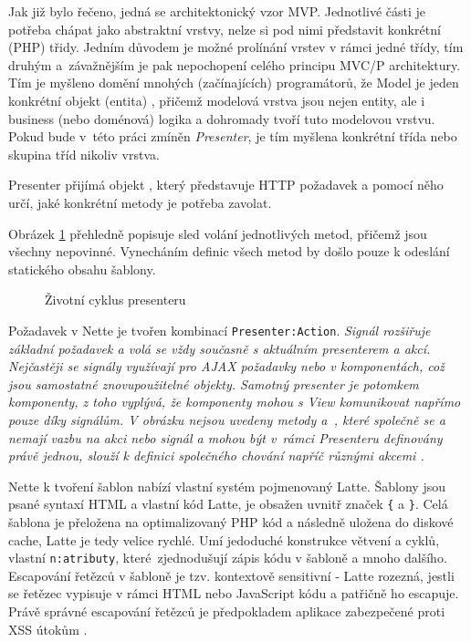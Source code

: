 Jak již bylo řečeno, jedná se architektonický vzor MVP. 
Jednotlivé části je potřeba chápat jako abstraktní vrstvy, nelze si pod nimi představit konkrétní (PHP) třidy. Jedním důvodem je možné prolínání vrstev v rámci jedné třídy, tím druhým a~závažnějším je pak nepochopení celého principu MVC/P architektury. Tím je myšleno domění mnohých (začínajících) programátorů, že Model je jeden konkrétní objekt (entita) \cite{MVCmodel}, přičemž modelová vrstva jsou nejen entity, ale i business (nebo doménová) logika a dohromady tvoří tuto modelovou vrstvu. Pokud bude v~této práci zmíněn \textit{Presenter}, je tím myšlena konkrétní třída nebo skupina tříd nikoliv vrstva.


Presenter přijímá objekt , který představuje HTTP požadavek a pomocí něho určí, jaké konkrétní metody je potřeba zavolat. 

Obrázek \ref{fig:zivotniCyklusPresenteru} přehledně popisuje sled volání jednotlivých metod, přičemž jsou všechny nepovinné. Vynecháním definic všech metod by došlo pouze k odeslání statického obsahu šablony.

\begin{figure}[h]
		\centering \footnotesize {}\selectfont
		
		\normalsize \sffamily
		\captionsetup{width=\linewidth}
		\caption[Životní cyklus presenteru]{Životní cyklus presenteru \cite{NetteDocs}}
		\label{fig:zivotniCyklusPresenteru}
\end{figure}

Požadavek v Nette je tvořen kombinací \texttt{Presenter:Action}. \it{Signál} rozšiřuje základní požadavek a volá se vždy současně s aktuálním presenterem a akcí. Nejčastěji se signály využívají pro AJAX požadavky nebo v komponentách, což jsou samostatné znovupoužitelné objekty. Samotný presenter je potomkem komponenty, z toho vyplývá, že komponenty mohou s View komunikovat napřímo pouze díky signálům. V obrázku nejsou uvedeny metody  a~, které společně se  a  nemají vazbu na \it{akci} nebo \it{signál} a mohou být v~rámci Presenteru definovány právě jednou, slouží k definici společného chování napříč různými akcemi \cite{NettePresentery}.

Nette k tvoření šablon nabízí vlastní systém pojmenovaný Latte. Šablony jsou psané syntaxí HTML a vlastní kód Latte, je obsažen uvnitř značek \texttt{\{} a \texttt{\}}. Celá šablona je přeložena na optimalizovaný PHP kód a následně uložena do diskové cache, Latte je tedy velice rychlé. Umí jedoduché konstrukce větvení a cyklů, vlastní \texttt{n:atributy}, které~zjednodušují zápis kódu v šabloně a mnoho dalšího. Escapování řetězců v šabloně je tzv. kontextově sensitivní - Latte rozezná, jestli se řetězec vypisuje v rámci HTML nebo JavaScript kódu a patřičně ho escapuje. Právě správné escapování řetězců je předpokladem aplikace zabezpečené proti XSS útokům \cite{XssPrevention}\cite{Latte}.

